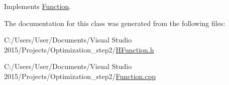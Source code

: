 Implements \hyperlink{class_function_ab19392e324813377fc6171bf354c24fb}{Function}.



The documentation for this class was generated from the following files\+:\begin{DoxyCompactItemize}
\item 
C\+:/\+Users/\+User/\+Documents/\+Visual Studio 2015/\+Projects/\+Optimization\+\_\+step2/\hyperlink{_h_function_8h}{H\+Function.\+h}\item 
C\+:/\+Users/\+User/\+Documents/\+Visual Studio 2015/\+Projects/\+Optimization\+\_\+step2/\hyperlink{_function_8cpp}{Function.\+cpp}\end{DoxyCompactItemize}
